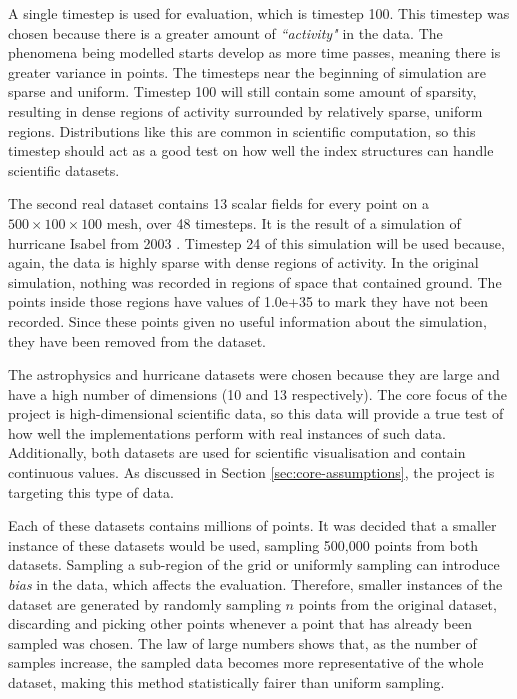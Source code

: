 A single timestep is used for evaluation, which is timestep 100. This timestep was chosen because there is a greater amount of \textit{``activity"} in the data. The phenomena being modelled starts develop as more time passes, meaning there is greater variance in points. The timesteps near the beginning of simulation are sparse and uniform. Timestep 100 will still contain some amount of sparsity, resulting in dense regions of activity surrounded by relatively sparse, uniform regions. Distributions like this are common in scientific computation, so this timestep should act as a good test on how well the index structures can handle scientific datasets.

The second real dataset contains 13 scalar fields for every point on a $500 \times 100 \times 100$ mesh, over 48 timesteps. It is the result of a simulation of hurricane Isabel from 2003 \cite{hurricane-isabel-dataset}. Timestep 24 of this simulation will be used because, again, the data is highly sparse with dense regions of activity. In the original simulation, nothing was recorded in regions of space that contained ground. The points inside those regions have values of 1.0e+35 to mark they have not been recorded. Since these points given no useful information about the simulation, they have been removed from the dataset.

The astrophysics and hurricane datasets were chosen because they are large and have a high number of dimensions (10 and 13 respectively). The core focus of the project is high-dimensional scientific data, so this data will provide a true test of how well the implementations perform with real instances of such data. Additionally, both datasets are used for scientific visualisation and contain continuous values. As discussed in Section \ref{sec:core-assumptions}, the project is targeting this type of data.

Each of these datasets contains millions of points. It was decided that a smaller instance of these datasets would be used, sampling 500,000 points from both datasets. Sampling a sub-region of the grid or uniformly sampling can introduce \textit{bias} in the data, which affects the evaluation. Therefore, smaller instances of the dataset are generated by randomly sampling $n$ points from the original dataset, discarding and picking other points whenever a point that has already been sampled was chosen. The law of large numbers \cite{large-sample-theory} shows that, as the number of samples increase, the sampled data becomes more representative of the whole dataset, making this method statistically fairer than uniform sampling.

